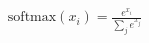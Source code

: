 \documentclass[preview]{standalone}
\begin{document}
\begin{align*}
\text{softmax}(x_i) = \frac{e^{x_i}}{\sum_j e^{x_j}}
\end{align*}
\end{document}
